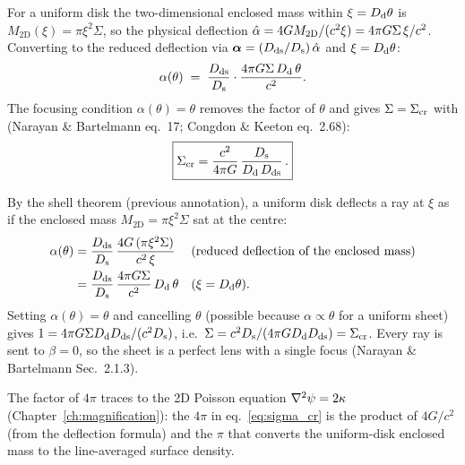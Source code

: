 For a uniform disk the two-dimensional enclosed mass within
$\xi = D_{\mathrm{d}}\theta$ is $M_{\mathrm{2D}}(\xi) = \pi\xi^2\Sigma$, so
the physical deflection
$\hat{\alpha} = 4G M_{\mathrm{2D}}/(c^2\xi)
= 4\pi G\Sigma\,\xi/c^2$.
Converting to the reduced deflection via
$\boldsymbol{\alpha} = (D_{\mathrm{ds}}/D_{\mathrm{s}})\,\hat{\alpha}$ and $\xi = D_{\mathrm{d}}\theta$:
\begin{equation*}
    \alpha(\theta) \;=\; \frac{D_{\mathrm{ds}}}{D_{\mathrm{s}}}\cdot
        \frac{4\pi G\Sigma\,D_{\mathrm{d}}\,\theta}{c^2}.
\end{equation*}
The focusing condition $\alpha(\theta) = \theta$ removes the factor
of $\theta$ and gives $\Sigma = \Sigma_{\mathrm{cr}}$ with
(Narayan \& Bartelmann eq.~17; Congdon \& Keeton eq.~2.68):
\begin{equation}
    \boxed{
    \Sigma_{\mathrm{cr}} = \frac{c^2}{4\pi G}
    \,\frac{D_{\mathrm{s}}}{D_{\mathrm{d}}\, D_{\mathrm{ds}}} \,.}
    \label{eq:sigma_cr}
\end{equation}
\begin{derivation}
By the shell theorem (previous annotation), a uniform disk deflects a ray at
$\xi$ as if the enclosed mass $M_{\mathrm{2D}} = \pi\xi^2\Sigma$ sat at the
centre:
\begin{align*}
    \alpha(\theta)
    &= \frac{D_{\mathrm{ds}}}{D_{\mathrm{s}}}\,\frac{4G\,(\pi\xi^2\Sigma)}{c^2\,\xi}
       && \text{(reduced deflection of the enclosed mass)}\\
    &= \frac{D_{\mathrm{ds}}}{D_{\mathrm{s}}}\,\frac{4\pi G\Sigma}{c^2}\,D_{\mathrm{d}}\,\theta
       && (\xi = D_{\mathrm{d}}\theta).
\end{align*}
Setting $\alpha(\theta) = \theta$ and cancelling $\theta$ (possible because
$\alpha \propto \theta$ for a uniform sheet) gives
$1 = 4\pi G\Sigma D_{\mathrm{d}}D_{\mathrm{ds}}/(c^2D_{\mathrm{s}})$, i.e.\
$\Sigma = c^2D_{\mathrm{s}}/(4\pi GD_{\mathrm{d}}D_{\mathrm{ds}}) = \Sigma_{\mathrm{cr}}$. Every ray is
sent to $\beta = 0$, so the sheet is a perfect lens with a single focus
(Narayan \& Bartelmann Sec.~2.1.3).
\end{derivation}

\begin{remark}
The factor of $4\pi$ traces to the 2D Poisson equation
$\nabla^2\psi = 2\kappa$ (Chapter~\ref{ch:magnification}): the $4\pi$ in
eq.~\eqref{eq:sigma_cr} is the product of $4G/c^2$ (from the deflection
formula) and the $\pi$ that converts the uniform-disk enclosed mass to
the line-averaged surface density.
\end{remark}

